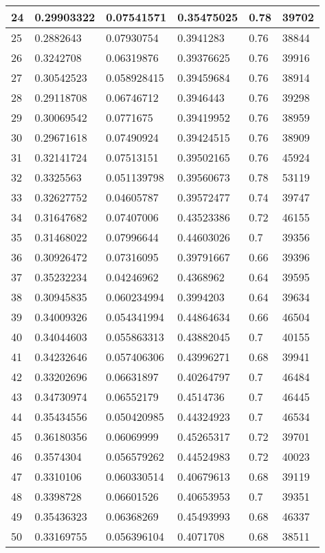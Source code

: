 \begin{longtable}{|l|l|l|l|l|l|}
24 & 0.29903322 & 0.07541571 & 0.35475025 & 0.78 & 39702 \\ \hline 
25 & 0.2882643 & 0.07930754 & 0.3941283 & 0.76 & 38844 \\ \hline 
26 & 0.3242708 & 0.06319876 & 0.39376625 & 0.76 & 39916 \\ \hline 
27 & 0.30542523 & 0.058928415 & 0.39459684 & 0.76 & 38914 \\ \hline 
28 & 0.29118708 & 0.06746712 & 0.3946443 & 0.76 & 39298 \\ \hline 
29 & 0.30069542 & 0.0771675 & 0.39419952 & 0.76 & 38959 \\ \hline 
30 & 0.29671618 & 0.07490924 & 0.39424515 & 0.76 & 38909 \\ \hline 
31 & 0.32141724 & 0.07513151 & 0.39502165 & 0.76 & 45924 \\ \hline 
32 & 0.3325563 & 0.051139798 & 0.39560673 & 0.78 & 53119 \\ \hline 
33 & 0.32627752 & 0.04605787 & 0.39572477 & 0.74 & 39747 \\ \hline 
34 & 0.31647682 & 0.07407006 & 0.43523386 & 0.72 & 46155 \\ \hline 
35 & 0.31468022 & 0.07996644 & 0.44603026 & 0.7 & 39356 \\ \hline 
36 & 0.30926472 & 0.07316095 & 0.39791667 & 0.66 & 39396 \\ \hline 
37 & 0.35232234 & 0.04246962 & 0.4368962 & 0.64 & 39595 \\ \hline 
38 & 0.30945835 & 0.060234994 & 0.3994203 & 0.64 & 39634 \\ \hline 
39 & 0.34009326 & 0.054341994 & 0.44864634 & 0.66 & 46504 \\ \hline 
40 & 0.34044603 & 0.055863313 & 0.43882045 & 0.7 & 40155 \\ \hline 
41 & 0.34232646 & 0.057406306 & 0.43996271 & 0.68 & 39941 \\ \hline 
42 & 0.33202696 & 0.06631897 & 0.40264797 & 0.7 & 46484 \\ \hline 
43 & 0.34730974 & 0.06552179 & 0.4514736 & 0.7 & 46445 \\ \hline 
44 & 0.35434556 & 0.050420985 & 0.44324923 & 0.7 & 46534 \\ \hline 
45 & 0.36180356 & 0.06069999 & 0.45265317 & 0.72 & 39701 \\ \hline 
46 & 0.3574304 & 0.056579262 & 0.44524983 & 0.72 & 40023 \\ \hline 
47 & 0.3310106 & 0.060330514 & 0.40679613 & 0.68 & 39119 \\ \hline 
48 & 0.3398728 & 0.06601526 & 0.40653953 & 0.7 & 39351 \\ \hline 
49 & 0.35436323 & 0.06368269 & 0.45493993 & 0.68 & 46337 \\ \hline 
50 & 0.33169755 & 0.056396104 & 0.4071708 & 0.68 & 38511 \\ \hline 
\end{longtable}